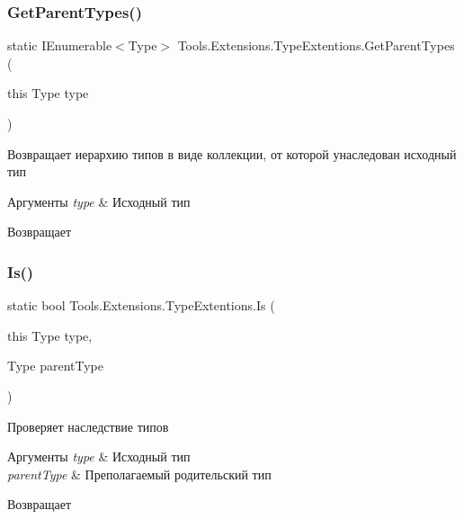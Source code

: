 \subsubsection{\texorpdfstring{Get\+Parent\+Types()}{GetParentTypes()}}
{\footnotesize\ttfamily static I\+Enumerable$<$Type$>$ Tools.\+Extensions.\+Type\+Extentions.\+Get\+Parent\+Types (\begin{DoxyParamCaption}\item[{this Type}]{type }\end{DoxyParamCaption})\hspace{0.3cm}{\ttfamily [static]}}



Возвращает иерархию типов в виде коллекции, от которой унаследован исходный тип 


\begin{DoxyParams}{Аргументы}
{\em type} & Исходный тип\\
\hline
\end{DoxyParams}
\begin{DoxyReturn}{Возвращает}

\end{DoxyReturn}
\mbox{\label{class_tools_1_1_extensions_1_1_type_extentions_a017a96cb151575a7764579ca8e229361}} 
\subsubsection{\texorpdfstring{Is()}{Is()}\hspace{0.1cm}{\footnotesize\ttfamily [1/2]}}
{\footnotesize\ttfamily static bool Tools.\+Extensions.\+Type\+Extentions.\+Is (\begin{DoxyParamCaption}\item[{this Type}]{type,  }\item[{Type}]{parent\+Type }\end{DoxyParamCaption})\hspace{0.3cm}{\ttfamily [static]}}



Проверяет наследствие типов 


\begin{DoxyParams}{Аргументы}
{\em type} & Исходный тип\\
\hline
{\em parent\+Type} & Преполагаемый родительский тип\\
\hline
\end{DoxyParams}
\begin{DoxyReturn}{Возвращает}

\end{DoxyReturn}
\mbox{\label{class_tools_1_1_extensions_1_1_type_extentions_abc962196a457621d9b9bad1498cd0903}} 
